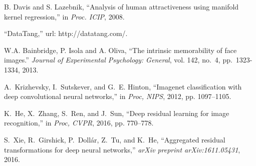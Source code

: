 \documentclass[10pt,conference,a4paper]{IEEEtran}
\begin{document}
\begin{thebibliography}{1}
B. Davis and S. Lazebnik, ``Analysis of human attractiveness using manifold kernel regression,'' in \emph{Proc. ICIP}, 2008.

``DataTang,'' url: http://datatang.com/.

W.A. Bainbridge, P. Isola and A. Oliva, ``The intrinsic memorability of face images.'' \emph{Journal of Experimental Psychology: General}, vol. 142, no.~4, pp.~1323-1334, 2013.

A.~Krizhevsky, I.~Sutskever, and G.~E. Hinton, ``Imagenet classification with deep convolutional neural networks,'' in \emph{Proc, NIPS}, 2012, pp. 1097--1105.

K.~He, X.~Zhang, S.~Ren, and J.~Sun, ``Deep residual learning for image recognition,'' in \emph{Proc, CVPR}, 2016, pp. 770--778.

S.~Xie, R.~Girshick, P.~Doll{\'a}r, Z.~Tu, and K.~He, ``Aggregated residual transformations for deep neural networks,'' \emph{arXiv preprint arXiv:1611.05431}, 2016.
\end{thebibliography}
\end{document}
